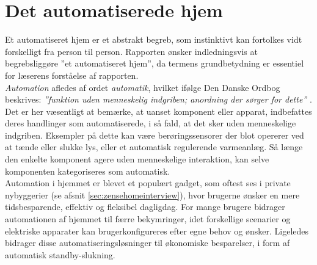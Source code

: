 \section{Det automatiserede hjem}
Et automatiseret hjem er et abstrakt begreb, som instinktivt kan fortolkes vidt forskelligt fra person til person. Rapporten ønsker indledningsvis at begrebsliggøre ”et automatiseret hjem”, da termens grundbetydning er essentiel for læserens forståelse af rapporten.\\

\textit{Automation} afledes af ordet \textit{automatik}, hvilket ifølge Den Danske Ordbog beskrives: \textit{”funktion uden menneskelig indgriben; anordning der sørger for dette”} \cite{AutomationORDNET}.\\

Det er her væsentligt at bemærke, at uanset komponent eller apparat, indbefattes deres handlinger som automatiserede, i så fald, at det sker uden menneskelige indgriben. Eksempler på dette kan være berøringssensorer der blot opererer ved at tænde eller slukke lys, eller et automatisk regulerende varmeanlæg. Så længe den enkelte komponent agere uden menneskelige interaktion, kan selve komponenten kategoriseres som automatisk. \\

Automation i hjemmet er blevet et populært gadget, som oftest ses i private nybyggerier (se afsnit \ref{sec:zensehomeinterview}), hvor brugerne ønsker en mere tidsbesparende, effektiv og fleksibel dagligdag. For mange brugere bidrager automationen af hjemmet til færre bekymringer, idet forskellige scenarier og elektriske apparater kan brugerkonfigureres efter egne behov og ønsker. Ligeledes bidrager disse automatiseringsløsninger til økonomiske besparelser, i form af automatisk standby-slukning.








